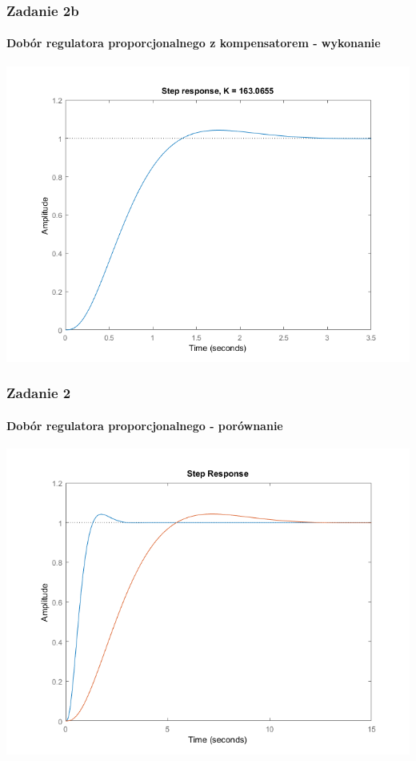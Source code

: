 \documentclass{beamer}
\begin{document}
\begin{frame}\frametitle{Zadanie 2b}\framesubtitle{Dobór regulatora proporcjonalnego z kompensatorem - wykonanie}
\centering	\includegraphics[scale=0.5]{b-sys-zamk-k.png}
\end{frame}

\begin{frame}\frametitle{Zadanie 2}\framesubtitle{Dobór regulatora proporcjonalnego - porównanie}
\centering	\includegraphics[scale=0.5]{step-oba.png}
\end{frame}
\end{document}
